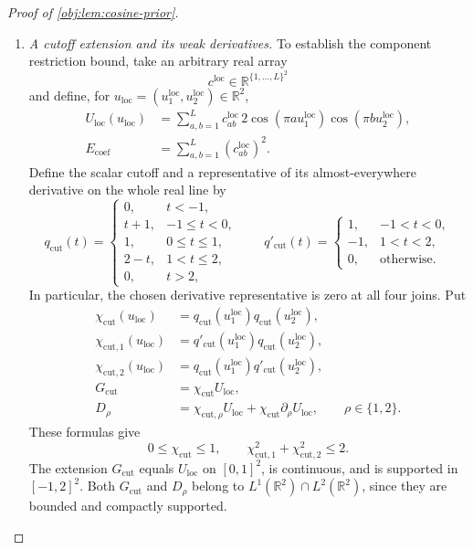 \documentclass[11pt]{article}
\begin{document}
\begin{proof}[Proof of \cref{obj:lem:cosine-prior}]
\begin{enumerate}
\item \emph{A cutoff extension and its weak derivatives.}
To establish the component restriction bound, take an arbitrary real array
\[
c^{\mathrm{loc}}\in\mathbb R^{\{1,\ldots,L\}^2}
\]
and define, for
\(u_{\mathrm{loc}}=(u_1^{\mathrm{loc}},u_2^{\mathrm{loc}})\in\mathbb R^2\),
\[
\begin{aligned}
U_{\mathrm{loc}}(u_{\mathrm{loc}})
&=\sum_{a,b=1}^L c^{\mathrm{loc}}_{ab}
  \,2\cos(\pi a u_1^{\mathrm{loc}})
     \cos(\pi b u_2^{\mathrm{loc}}),\\
E_{\mathrm{coef}}
&=\sum_{a,b=1}^L(c^{\mathrm{loc}}_{ab})^2.
\end{aligned}
\]
Define the scalar cutoff and a representative of its almost-everywhere
derivative on the whole real line by
\[
q_{\mathrm{cut}}(t)=
\begin{cases}
0,&t<-1,\\
t+1,&-1\leq t<0,\\
1,&0\leq t\leq1,\\
2-t,&1<t\leq2,\\
0,&t>2,
\end{cases}
\qquad
q'_{\mathrm{cut}}(t)=
\begin{cases}
1,&-1<t<0,\\
-1,&1<t<2,\\
0,&\text{otherwise}.
\end{cases}
\]
In particular, the chosen derivative representative is zero at all four
joins. Put
\[
\begin{aligned}
\chi_{\mathrm{cut}}(u_{\mathrm{loc}})
&=q_{\mathrm{cut}}(u_1^{\mathrm{loc}})
  q_{\mathrm{cut}}(u_2^{\mathrm{loc}}),\\
\chi_{\mathrm{cut},1}(u_{\mathrm{loc}})
&=q'_{\mathrm{cut}}(u_1^{\mathrm{loc}})
  q_{\mathrm{cut}}(u_2^{\mathrm{loc}}),\\
\chi_{\mathrm{cut},2}(u_{\mathrm{loc}})
&=q_{\mathrm{cut}}(u_1^{\mathrm{loc}})
  q'_{\mathrm{cut}}(u_2^{\mathrm{loc}}),\\
G_{\mathrm{cut}}&=\chi_{\mathrm{cut}}U_{\mathrm{loc}},\\
D_\rho
&=\chi_{\mathrm{cut},\rho}U_{\mathrm{loc}}
  +\chi_{\mathrm{cut}}\partial_\rho U_{\mathrm{loc}},
  \qquad \rho\in\{1,2\}.
\end{aligned}
\]
These formulas give
\[
0\leq\chi_{\mathrm{cut}}\leq1,
\qquad
\chi_{\mathrm{cut},1}^2+\chi_{\mathrm{cut},2}^2\leq2.
\]
The extension \(G_{\mathrm{cut}}\) equals \(U_{\mathrm{loc}}\) on
\([0,1]^2\), is continuous, and is supported in \([-1,2]^2\).
Both \(G_{\mathrm{cut}}\) and \(D_\rho\) belong to
\(L^1(\mathbb R^2)\cap L^2(\mathbb R^2)\), since they are bounded and
compactly supported.


\end{enumerate}
\end{proof}
\end{document}
